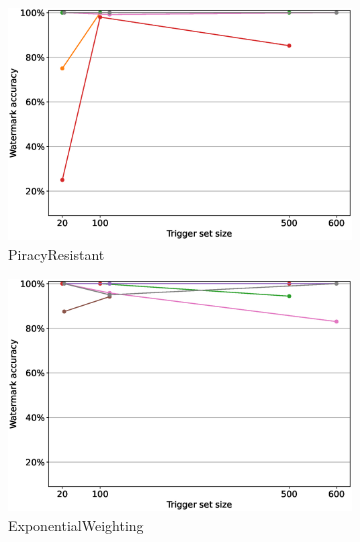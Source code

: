 \begin{figure}
\begin{subfigure}{0.4\linewidth}
        \includegraphics[width=\linewidth]{images/pruning/per_method/PiracyResistant_pruning_per_method_maximal_pr_rate.eps}
        \caption{PiracyResistant}
        \label{fig:pruning-max-pr-rate-piracy}
    \end{subfigure}
    \quad
    \begin{subfigure}{0.4\linewidth}
        \includegraphics[width=\linewidth]{images/pruning/per_method/ExponentialWeighting_pruning_per_method_maximal_pr_rate.eps}
        \caption{ExponentialWeighting}
        \label{fig:pruning-max-pr-rate-exponential}
    \end{subfigure}
    \quad
    \begin{subfigure}{0.4\linewidth}

\end{subfigure}
\end{figure}
